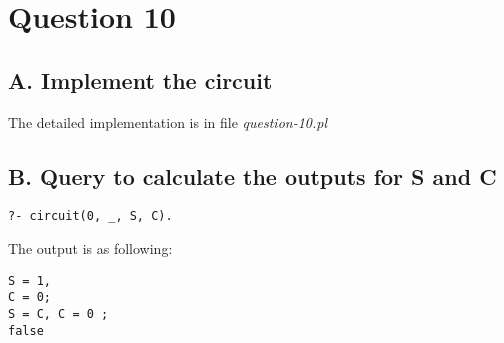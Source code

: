 \section{Question 10}

\subsection{A. Implement the circuit}
The detailed implementation is in file \textit{question-10.pl}

\subsection{B. Query to calculate the outputs for S and C }

\begin{lstlisting}
?- circuit(0, _, S, C).
\end{lstlisting}

The output is as following:
\begin{lstlisting}
S = 1,
C = 0;
S = C, C = 0 ;
false
\end{lstlisting}
